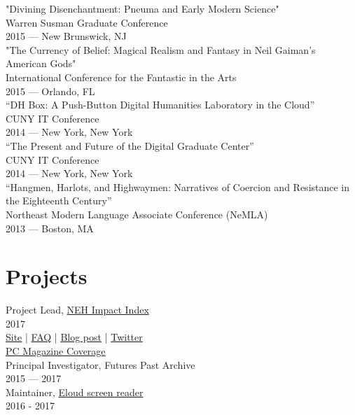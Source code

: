 \documentclass[11pt]{article}
\begin{document}
"Divining Disenchantment: Pneuma and Early Modern Science"\\
Warren Susman Graduate Conference\\
2015 — New Brunswick, NJ\\

"The Currency of Belief: Magical Realism and Fantasy in Neil Gaiman’s American Gods"\\
International Conference for the Fantastic in the Arts\\
2015 — Orlando, FL\\

“DH Box: A Push-Button Digital Humanities Laboratory in the Cloud”\\
CUNY IT Conference\\
2014 — New York, New York\\

“The Present and Future of the Digital Graduate Center”\\
CUNY IT Conference\\
2014 — New York, New York\\

“Hangmen, Harlots, and Highwaymen: Narratives of Coercion and Resistance in the Eighteenth Century”\\
Northeast Modern Language Associate Conference (NeMLA)\\
2013 — Boston, MA\\

\section*{Projects}
\label{sec:orgheadline8}
Project Lead, \href{http://www.nehimpact.org/}{NEH Impact Index}\\
2017\\
\href{http://www.nehimpact.org/}{Site} | \href{http://www.nehimpact.org/faq}{FAQ} | \href{https://digitalfellows.commons.gc.cuny.edu/2017/04/10/exploring-the-local-impact-of-the-neh-neh-impact-index/}{Blog post} | \href{https://twitter.com/psmyth01/status/851505002900336644}{Twitter}\\
\href{http://www.pcmag.com/commentary/353904/trump-budget-slashes-neh-funding-why-you-should-care}{PC Magazine Coverage}\\

Principal Investigator, Futures Past Archive\\
2015 — 2017\\

Maintainer, \href{https://github.com/smythp/eloud}{Eloud screen reader}\\
2016 - 2017\\
\end{document}
